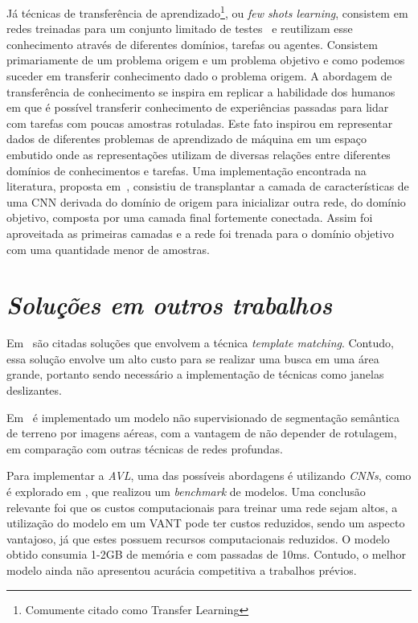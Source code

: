 Já técnicas de transferência de aprendizado\footnote{Comumente citado como Transfer Learning}, ou \textit{few shots learning}, consistem em redes treinadas para um conjunto limitado de testes~\cite{rostami2019learning}
e reutilizam esse conhecimento através de diferentes domínios, tarefas ou agentes. Consistem primariamente de um problema origem e um problema objetivo e como podemos suceder em transferir conhecimento dado o problema origem. A abordagem de transferência de conhecimento se inspira em replicar a habilidade dos humanos em que é possível transferir conhecimento de experiências passadas para lidar com tarefas com poucas amostras rotuladas. Este fato inspirou em representar dados de diferentes problemas de aprendizado de máquina em um espaço embutido onde as representações utilizam de diversas relações entre diferentes domínios de conhecimentos e tarefas. Uma implementação encontrada na literatura, proposta em~\cite{DBLP:journals/corr/abs-1811-04863}, consistiu de transplantar a camada de características de uma CNN derivada do domínio de origem para inicializar outra rede, do domínio objetivo, composta por uma camada final fortemente conectada. Assim foi aproveitada as primeiras camadas e a rede foi trenada para o domínio objetivo com uma quantidade menor de amostras.

\section{\textit{Soluções em outros trabalhos}}\label{sec:Cap2_propostas}


Em~\cite{COUTURIER2021103666} são citadas soluções que envolvem a técnica \textit{template matching}. Contudo, essa solução envolve um alto custo para se realizar uma busca em uma área grande, portanto sendo necessário a implementação de técnicas como janelas deslizantes.

Em~\cite{9552597} é implementado um modelo não supervisionado de segmentação semântica de terreno por imagens aéreas, com a vantagem de não depender de rotulagem, em comparação com outras técnicas de redes profundas.

Para implementar a \textit{AVL}, uma das possíveis abordagens é utilizando \textit{CNNs}, como é explorado em \cite{rs13194017}, que realizou um \textit{benchmark} de modelos. Uma conclusão relevante foi que os custos computacionais para treinar uma rede sejam altos, a utilização do modelo em um VANT pode ter custos reduzidos, sendo um aspecto vantajoso, já que estes possuem recursos computacionais reduzidos. O modelo obtido consumia 1-2GB de memória e com passadas de 10ms. Contudo, o melhor modelo ainda não apresentou acurácia competitiva a trabalhos prévios.


